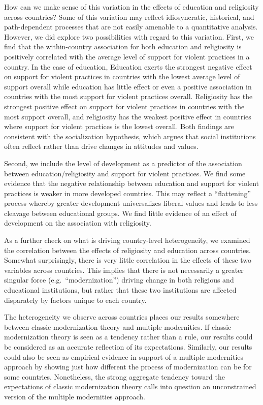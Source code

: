 \documentclass[10pt,letterpaper]{article}
\begin{document}
How can we make sense of this variation in the effects of education and
religiosity across countries? Some of this variation may reflect
idiosyncratic, historical, and path-dependent processes that are not
easily amenable to a quantitative analysis. However, we did explore two
possibilities with regard to this variation. First, we find that the
within-country association for both education and religiosity is
positively correlated with the average level of support for violent
practices in a country. In the case of education, Education exerts the
strongest negative effect on support for violent practices in countries
with the lowest average level of support overall while education has
little effect or even a positive association in countries with the most
support for violent practices overall. Religiosity has the strongest
positive effect on support for violent practices in countries with the
most support overall, and religiosity has the weakest positive effect in
countries where support for violent practices is the lowest overall.
Both findings are consistent with the socialization hypothesis, which
argues that social institutions often reflect rather than drive changes
in attitudes and values.

Second, we include the level of development as a predictor of the
association between education/religiosity and support for violent
practices. We find some evidence that the negative relationship between
education and support for violent practices is weaker in more developed
countries. This may reflect a ``flattening'' process whereby greater
development universalizes liberal values and leads to less cleavage
between educational groups. We find little evidence of an effect of
development on the association with religiosity.

As a further check on what is driving country-level heterogeneity, we
examined the correlation between the effects of religiosity and
education across countries. Somewhat surprisingly, there is very little
correlation in the effects of these two variables across countries. This
implies that there is not necessarily a greater singular force
(e.g.~``modernization'') driving change in both religious and
educational institutions, but rather that these two institutions are
affected disparately by factors unique to each country.

The heterogeneity we observe across countries places our results
somewhere between classic modernization theory and multiple modernities.
If classic modernization theory is seen as a tendency rather than a
rule, our results could be considered as an accurate reflection of its
expectations. Similarly, our results could also be seen as empirical
evidence in support of a multiple modernities approach by showing just
how different the process of modernization can be for some countries.
Nonetheless, the strong aggregate tendency toward the expectations of
classic modernization theory calls into question an unconstrained
version of the multiple modernities approach.
\end{document}
